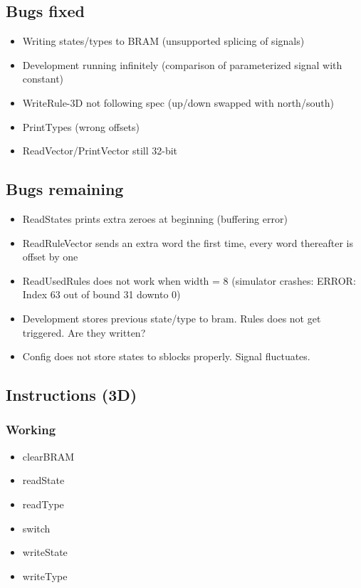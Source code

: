 \subsection{Bugs fixed}

\begin{itemize}
    \item Writing states/types to BRAM (unsupported splicing of signals)
    \item Development running infinitely (comparison of parameterized signal with constant)
    \item WriteRule-3D not following spec (up/down swapped with north/south)
    \item PrintTypes (wrong offsets)
    \item ReadVector/PrintVector still 32-bit
\end{itemize}

\subsection{Bugs remaining}

\begin{itemize}
    \item ReadStates prints extra zeroes at beginning (buffering error)
    \item ReadRuleVector sends an extra word the first time, every word thereafter is offset by one
    \item ReadUsedRules does not work when width = 8 (simulator crashes: ERROR: Index 63 out of bound 31 downto 0)
    \item Development stores previous state/type to bram. Rules does not get triggered. Are they written?
    \item Config does not store states to sblocks properly. Signal fluctuates.
\end{itemize}

\subsection{Instructions (3D)}

\subsubsection{Working}

\begin{itemize}
    \item clearBRAM
    \item readState
    \item readType
    \item switch
    \item writeState
    \item writeType
\end{itemize}

